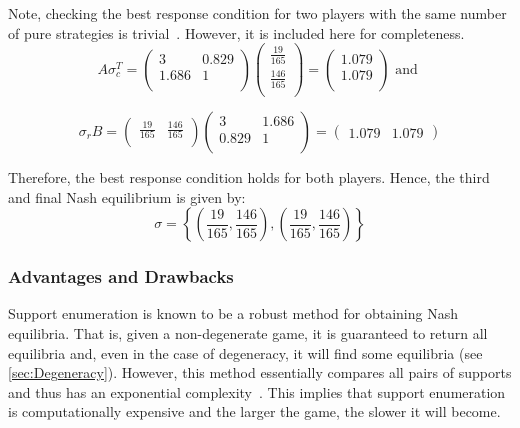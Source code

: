 Note, checking the best response condition for two players with the same number
of pure strategies is trivial~\cite{Knight2019b}. However, it is included here for completeness.
\begin{displaymath}
    A\sigma_{c}^{T} = \begin{pmatrix}
        3 & 0.829 \\
        1.686 & 1 \\
    \end{pmatrix} \begin{pmatrix}
        \frac{19}{165} \\
        \frac{146}{165} \\
    \end{pmatrix} = \begin{pmatrix}
        1.079 \\
        1.079 \\
    \end{pmatrix} \text{   and   }
\end{displaymath}

\begin{displaymath}
    \sigma_{r}B = \begin{pmatrix}
        \frac{19}{165} & \frac{146}{165} \\
    \end{pmatrix} \begin{pmatrix}
        3 & 1.686 \\
        0.829 & 1 \\
    \end{pmatrix} = \begin{pmatrix}
        1.079 & 1.079
    \end{pmatrix}
\end{displaymath}

Therefore, the best response condition holds for both players. Hence, the third and final Nash equilibrium is given by:
\begin{displaymath}
    \sigma = \left \{ (\frac{19}{165}, \frac{146}{165}), (\frac{19}{165}, \frac{146}{165})\right \}
\end{displaymath}


\subsubsection{Advantages and Drawbacks}\label{subsubsec:Adv_and_Drawbacks}
Support enumeration is known to be a robust method for obtaining Nash
equilibria. That is, given a non-degenerate game,
it is guaranteed to return all equilibria and, even in the case of degeneracy,
it will find some equilibria (see \autoref{sec:Degeneracy}). However, this method essentially
compares all pairs of supports and thus has an exponential complexity~\cite{Rampersaud2014}. This implies that support enumeration is
computationally expensive and the larger the game, the slower it will become.


